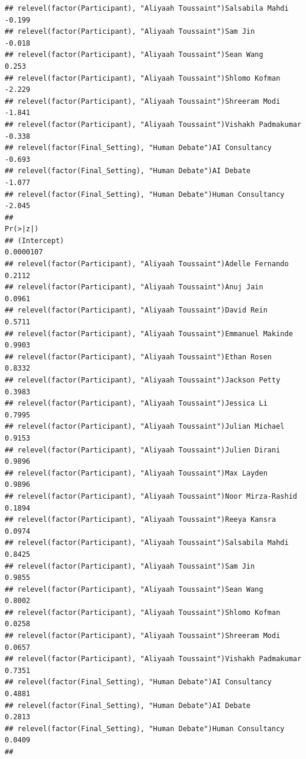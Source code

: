 \documentclass[
]{article}
\begin{document}
\begin{verbatim}
## relevel(factor(Participant), "Aliyaah Toussaint")Salsabila Mahdi     -0.199
## relevel(factor(Participant), "Aliyaah Toussaint")Sam Jin             -0.018
## relevel(factor(Participant), "Aliyaah Toussaint")Sean Wang            0.253
## relevel(factor(Participant), "Aliyaah Toussaint")Shlomo Kofman       -2.229
## relevel(factor(Participant), "Aliyaah Toussaint")Shreeram Modi       -1.841
## relevel(factor(Participant), "Aliyaah Toussaint")Vishakh Padmakumar  -0.338
## relevel(factor(Final_Setting), "Human Debate")AI Consultancy         -0.693
## relevel(factor(Final_Setting), "Human Debate")AI Debate              -1.077
## relevel(factor(Final_Setting), "Human Debate")Human Consultancy      -2.045
##                                                                      Pr(>|z|)
## (Intercept)                                                         0.0000107
## relevel(factor(Participant), "Aliyaah Toussaint")Adelle Fernando       0.2112
## relevel(factor(Participant), "Aliyaah Toussaint")Anuj Jain             0.0961
## relevel(factor(Participant), "Aliyaah Toussaint")David Rein            0.5711
## relevel(factor(Participant), "Aliyaah Toussaint")Emmanuel Makinde      0.9903
## relevel(factor(Participant), "Aliyaah Toussaint")Ethan Rosen           0.8332
## relevel(factor(Participant), "Aliyaah Toussaint")Jackson Petty         0.3983
## relevel(factor(Participant), "Aliyaah Toussaint")Jessica Li            0.7995
## relevel(factor(Participant), "Aliyaah Toussaint")Julian Michael        0.9153
## relevel(factor(Participant), "Aliyaah Toussaint")Julien Dirani         0.9896
## relevel(factor(Participant), "Aliyaah Toussaint")Max Layden            0.9896
## relevel(factor(Participant), "Aliyaah Toussaint")Noor Mirza-Rashid     0.1894
## relevel(factor(Participant), "Aliyaah Toussaint")Reeya Kansra          0.0974
## relevel(factor(Participant), "Aliyaah Toussaint")Salsabila Mahdi       0.8425
## relevel(factor(Participant), "Aliyaah Toussaint")Sam Jin               0.9855
## relevel(factor(Participant), "Aliyaah Toussaint")Sean Wang             0.8002
## relevel(factor(Participant), "Aliyaah Toussaint")Shlomo Kofman         0.0258
## relevel(factor(Participant), "Aliyaah Toussaint")Shreeram Modi         0.0657
## relevel(factor(Participant), "Aliyaah Toussaint")Vishakh Padmakumar    0.7351
## relevel(factor(Final_Setting), "Human Debate")AI Consultancy           0.4881
## relevel(factor(Final_Setting), "Human Debate")AI Debate                0.2813
## relevel(factor(Final_Setting), "Human Debate")Human Consultancy        0.0409
##                                                                        

\end{verbatim}
\end{document}
